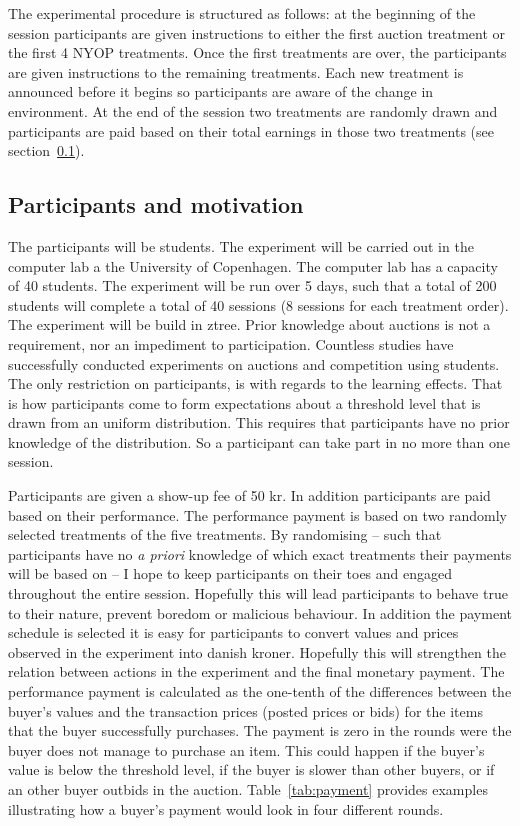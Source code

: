 \documentclass[a4paper,12pt]{article}
\begin{document}
	The experimental procedure is structured as follows: at the beginning of the session participants are given instructions to either the first auction treatment or the first 4 NYOP treatments. Once the first treatments are over, the participants are given instructions to the remaining treatments. Each new treatment is announced before it begins so participants are aware of the change in environment. At the end of the session two treatments are randomly drawn and participants are paid based on their total earnings in those two treatments (see section~\ref{sec:participants-motivation}).

	\subsection{Participants and motivation}
	\label{sec:participants-motivation}
	The participants will be students. The experiment will be carried out in the computer lab a the University of Copenhagen. The computer lab has a capacity of 40 students. The experiment will be run over 5 days, such that a total of 200 students will complete a total of 40 sessions (8 sessions for each treatment order). The experiment will be build in ztree. Prior knowledge about auctions is not a requirement, nor an impediment to participation. Countless studies have successfully conducted experiments on auctions and competition using students. The only restriction on participants, is with regards to the learning effects. That is how participants come to form expectations about a threshold level that is drawn from an uniform distribution. This requires that participants have no prior knowledge of the distribution. So a participant can take part in no more than one session.
	
	Participants are given a show-up fee of 50 kr. In addition participants are paid based on their performance. The performance payment is based on two randomly selected treatments of the five treatments. By randomising -- such that participants have no \emph{a priori} knowledge of which exact treatments their payments will be based on -- I hope to keep participants on their toes and engaged throughout the entire session. Hopefully this will lead participants to behave true to their nature, prevent boredom or malicious behaviour. In addition the payment schedule is selected it is easy for participants to convert values and prices observed in the experiment into danish kroner. Hopefully this will strengthen the relation between actions in the experiment and the final monetary payment. The performance payment is calculated as the one-tenth of the differences between the buyer's values and the transaction prices (posted prices or bids) for the items that the buyer successfully purchases. The payment is zero in the rounds were the buyer does not manage to purchase an item. This could happen if the buyer's value is below the threshold level, if the buyer is slower than other buyers, or if an other buyer outbids in the auction. Table~\ref{tab:payment} provides examples illustrating how a buyer's payment would look in four different rounds.
	
\end{document}
